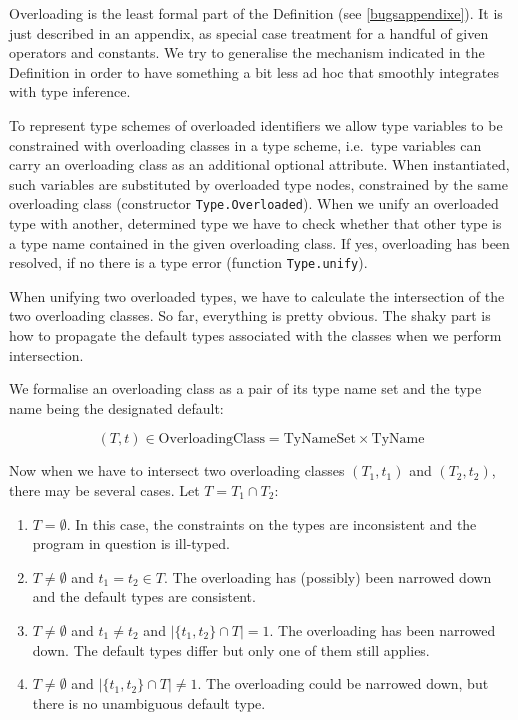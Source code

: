 \documentclass[twoside,titlepage]{article}
\begin{document}
Overloading is the least formal part of the Definition (see \ref{bugsappendixe}). It is just described in an appendix, as special case treatment for a handful of given operators and constants. We try to generalise the mechanism indicated in the Definition in order to have something a bit less ad hoc that smoothly integrates with type inference.

To represent type schemes of overloaded identifiers we allow type variables to be constrained with overloading classes in a type scheme, i.e.\ type variables can carry an overloading class as an additional optional attribute. When instantiated, such variables are substituted by overloaded type nodes, constrained by the same overloading class (constructor {\tt Type.Overloaded}). When we unify an overloaded type with another, determined type we have to check whether that other type is a type name contained in the given overloading class. If yes, overloading has been resolved, if no there is a type error (function {\tt Type.unify}).

When unifying two overloaded types, we have to calculate the intersection of the two overloading classes. So far, everything is pretty obvious. The shaky part is how to propagate the default types associated with the classes when we perform intersection.

We formalise an overloading class as a pair of its type name set and the type name being the designated default:

\begin{displaymath}
(T,t) \in \mbox{OverloadingClass} = \mbox{TyNameSet} \times \mbox{TyName}
\end{displaymath}

Now when we have to intersect two overloading classes $(T_1,t_1)$ and $(T_2,t_2)$, there may be several cases. Let $T = T_1 \cap T_2$:

\begin{enumerate}
\item\label{intersectempty} $T = \emptyset$. In this case, the constraints on the types are inconsistent and the program in question is ill-typed.

\item\label{defaultequal} $T \neq \emptyset$ and $t_1 = t_2 \in T$. The overloading has (possibly) been narrowed down and the default types are consistent.

\item\label{uniquedefault} $T \neq \emptyset$ and $t_1 \neq t_2$ and $|\{t_1,t_2\} \cap T| = 1$. The overloading has been narrowed down. The default types differ but only one of them still applies.

\item\label{ambiguousdefault} $T \neq \emptyset$ and $|\{t_1,t_2\} \cap T| \neq 1$. The overloading could be narrowed down, but there is no unambiguous default type.
\end{enumerate}
\end{document}

